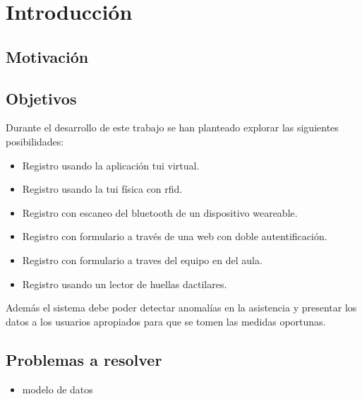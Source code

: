 \chapter{Introducción}

	\section{Motivación}


	\section{Objetivos}
		Durante el desarrollo de este trabajo se han planteado explorar las siguientes posibilidades:
		\begin{itemize}
			\item Registro usando la aplicación tui virtual.
			\item Registro usando la tui física con rfid.
			\item Registro con escaneo del bluetooth de un dispositivo weareable.
			\item Registro con formulario a través de una web con doble autentificación.
			\item Registro con formulario a traves del equipo en del aula.
			\item Registro usando un lector de huellas dactilares.
		\end{itemize}

		Además el sistema debe poder detectar anomalías en la asistencia y presentar los datos a los usuarios apropiados para que se tomen las medidas oportunas. 


	\section{Problemas a resolver}
		\begin{itemize}
			\item modelo de datos
		\end{itemize}
	
